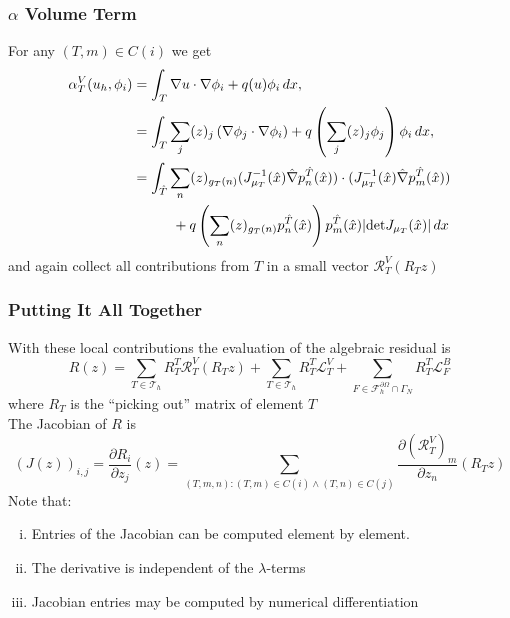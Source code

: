 \documentclass[aspectratio=169,11pt]{beamer}
\theoremstyle{definition}
\begin{document}
\begin{frame}
\frametitle{$\alpha$ Volume Term}
For any $(T,m)\in C(i)$ we get
\begin{equation*}
\begin{split}
\alpha_T^V(u_h,\phi_i) &= \int_T \nabla u \cdot \nabla \phi_i + q(u) \phi_i \,dx, \\
&= \int_T \sum_j (z)_j \left(\nabla \phi_j \cdot \nabla \phi_i \right)
+ q\left( \sum_j (z)_j \phi_j \right) \phi_i \,dx,\\
&= \int_{\hat T} \sum_{n} (z)_{g_T(n)} (J_{\mu_T}^{-1}(\hat x) \hat\nabla p_n^{\hat T}(\hat x) )
\cdot (J_{\mu_T}^{-1}(\hat x) \hat\nabla p_m^{\hat T}(\hat x) ) \\
&\hspace{10mm}+ q\left( \sum_n (z)_{g_T(n)} p_n^{\hat T}(\hat x) \right) p_m^{\hat T}(\hat x)
|\text{det} J_{\mu_T}(\hat x)| \,dx
\end{split}
\end{equation*}
and again collect all contributions from $T$ in a small vector $\mathcal{R}_T^V(R_T z)$
\end{frame}

\begin{frame}
\frametitle{Putting It All Together}
With these local contributions the evaluation of the algebraic residual is
\begin{equation*}
R(z) =
\sum_{T\in\mathcal{T}_h} R_T^T \mathcal{R}_T^V(R_T z)
  + \sum_{T\in\mathcal{T}_h} R_T^T \mathcal{L}_T^V
 + \sum_{F\in\mathcal{F}_h^{\partial\Omega}\cap\Gamma_N} R_T^T \mathcal{L}_F^B
\end{equation*}
where $R_T$ is the ``picking out'' matrix of element $T$\\
\medskip
The Jacobian of $R$ is
\begin{equation*}
(J(z))_{i,j} = \frac{\partial R_i}{\partial z_j} (z) =
\sum_{(T,m,n) : (T,m)\in C(i) \wedge (T,n)\in C(j)} \frac{\partial (\mathcal{R}_T^V)_m}{\partial z_n}
(R_T z)
\end{equation*}
Note that:
\begin{enumerate}[i)]
\item Entries of the Jacobian can be computed element by element.
\item The derivative is independent of the $\lambda$-terms
\item Jacobian entries may be computed by numerical differentiation
\end{enumerate}
\end{frame}
\end{document}
